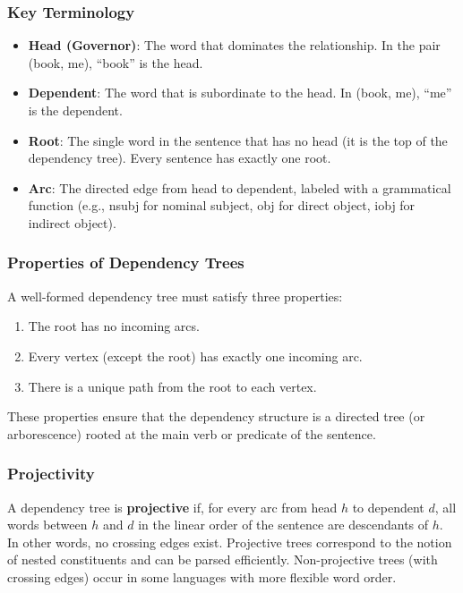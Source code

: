 \documentclass[11pt,a4paper]{article}
\begin{document}
\subsubsection{Key Terminology}

\begin{itemize}
    \item \textbf{Head (Governor)}: The word that dominates the relationship. In the pair (book, me), ``book'' is the head.
    \item \textbf{Dependent}: The word that is subordinate to the head. In (book, me), ``me'' is the dependent.
    \item \textbf{Root}: The single word in the sentence that has no head (it is the top of the dependency tree). Every sentence has exactly one root.
    \item \textbf{Arc}: The directed edge from head to dependent, labeled with a grammatical function (e.g., nsubj for nominal subject, obj for direct object, iobj for indirect object).
\end{itemize}

\subsubsection{Properties of Dependency Trees}

A well-formed dependency tree must satisfy three properties:
\begin{enumerate}
    \item The root has no incoming arcs.
    \item Every vertex (except the root) has exactly one incoming arc.
    \item There is a unique path from the root to each vertex.
\end{enumerate}

These properties ensure that the dependency structure is a directed tree (or arborescence) rooted at the main verb or predicate of the sentence.

\subsubsection{Projectivity}

A dependency tree is \textbf{projective} if, for every arc from head $h$ to dependent $d$, all words between $h$ and $d$ in the linear order of the sentence are descendants of $h$. In other words, no crossing edges exist. Projective trees correspond to the notion of nested constituents and can be parsed efficiently. Non-projective trees (with crossing edges) occur in some languages with more flexible word order.
\end{document}
